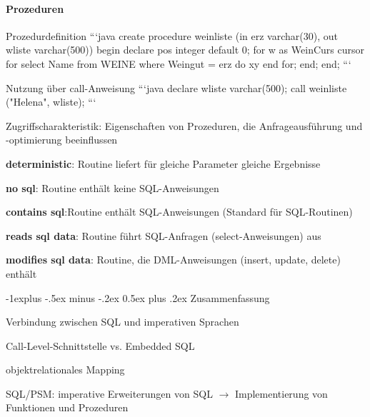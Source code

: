 \documentclass[a4paper]{article}
\makeatletter
\renewcommand{\subsection}{\@startsection{subsection}{2}{0mm}%
                                {-1explus -.5ex minus -.2ex}%
                                {0.5ex plus .2ex}%
                                {\normalfont\normalsize\bfseries}}
\makeatother
\begin{document}
\begin{multicols}{3}
\paragraph{Prozeduren}
Prozedurdefinition
```java
create procedure weinliste (in erz varchar(30),
out wliste varchar(500))
begin
declare pos integer default 0;
for w as WeinCurs cursor for
select Name from WEINE where Weingut = erz
do xy
end for;
end; end;
```

Nutzung über call-Anweisung
```java
declare wliste varchar(500);
call weinliste ("Helena", wliste);
```

Zugriffscharakteristik:
Eigenschaften von Prozeduren, die Anfrageausführung und -optimierung beeinflussen
\begin{itemize*}
    \item \textbf{deterministic}: Routine liefert für gleiche Parameter gleiche Ergebnisse
    \item \textbf{no sql}: Routine enthält keine SQL-Anweisungen
    \item \textbf{contains sql}:Routine enthält SQL-Anweisungen (Standard für SQL-Routinen)
    \item \textbf{reads sql data}: Routine führt SQL-Anfragen (select-Anweisungen) aus
    \item \textbf{modifies sql data}: Routine, die DML-Anweisungen (insert, update, delete) enthält
\end{itemize*}

\subsection{Zusammenfassung}
\begin{itemize*}
    \item Verbindung zwischen SQL und imperativen Sprachen
    \item Call-Level-Schnittstelle vs. Embedded SQL
    \item objektrelationales Mapping
    \item SQL/PSM: imperative Erweiterungen von SQL $\rightarrow$ Implementierung von Funktionen und Prozeduren
\end{itemize*}


\end{multicols}
\end{document}
